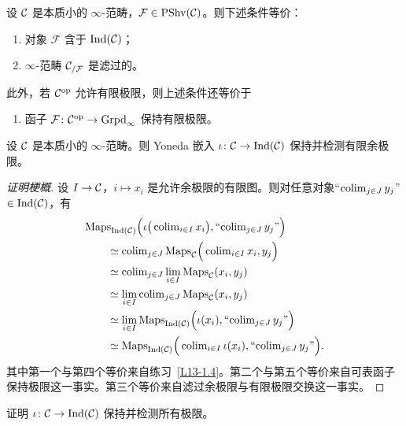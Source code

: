 \begin{proposition}[HTT.5.3.5.4]\label{L13-1.6}
设 $\mathcal{C}$ 是本质小的 $\infty$-范畴，$\mathcal{F}\in\mathrm{PShv}(\mathcal{C})$。则下述条件等价：
\begin{enumerate}[label=(\roman*),leftmargin=2.4em,itemsep=0.1em]
\item 对象 $\mathcal{F}$ 含于 $\operatorname{Ind}(\mathcal{C})$；
\item $\infty$-范畴 $\mathcal{C}_{/\mathcal{F}}$ 是滤过的。
\end{enumerate}
此外，若 $\mathcal{C}^{\mathrm{op}}$ 允许有限极限，则上述条件还等价于
\begin{enumerate}[label=(\roman*),leftmargin=2.4em,itemsep=0.1em,start=3]
\item 函子 $\mathcal{F}\colon\mathcal{C}^{\mathrm{op}}\to\operatorname{Grpd}_\infty$ 保持有限极限。
\end{enumerate}
\end{proposition}

\begin{proposition}\label{L13-1.7}
设 $\mathcal{C}$ 是本质小的 $\infty$-范畴。则 Yoneda 嵌入 $\iota\colon\mathcal{C}\to\operatorname{Ind}(\mathcal{C})$ 保持并检测有限余极限。
\end{proposition}

\begin{proof}[证明梗概]
设 $I\to\mathcal{C}$，$i\mapsto x_i$ 是允许余极限的有限图。则对任意对象“$\operatorname{colim}_{j\in J}y_j$”$\in\operatorname{Ind}(\mathcal{C})$，有
\[
\begin{aligned}
&\mathrm{Maps}_{\operatorname{Ind}(\mathcal{C})}\Big(\iota\big(\operatorname{colim}_{i\in I}x_i\big),\text{“$\operatorname{colim}_{j\in J}y_j$”}\Big)\\
&\qquad\simeq\operatorname{colim}_{j\in J}\mathrm{Maps}_{\mathcal{C}}\Big(\operatorname{colim}_{i\in I}x_i,y_j\Big)\\
&\qquad\simeq\operatorname{colim}_{j\in J}\lim_{i\in I}\mathrm{Maps}_{\mathcal{C}}(x_i,y_j)\\
&\qquad\simeq\lim_{i\in I}\operatorname{colim}_{j\in J}\mathrm{Maps}_{\mathcal{C}}(x_i,y_j)\\
&\qquad\simeq\lim_{i\in I}\mathrm{Maps}_{\operatorname{Ind}(\mathcal{C})}\Big(\iota(x_i),\text{“$\operatorname{colim}_{j\in J}y_j$”}\Big)\\
&\qquad\simeq\mathrm{Maps}_{\operatorname{Ind}(\mathcal{C})}\Big(\operatorname{colim}_{i\in I}\iota(x_i),\text{“$\operatorname{colim}_{j\in J}y_j$”}\Big).
\end{aligned}
\]
其中第一个与第四个等价来自练习~\ref{L13-1.4}。第二个与第五个等价来自可表函子保持极限这一事实。第三个等价来自滤过余极限与有限极限交换这一事实。
\end{proof}

\begin{exercise}\label{L13-1.8}
证明 $\iota\colon\mathcal{C}\to\operatorname{Ind}(\mathcal{C})$ 保持并检测所有极限。
\end{exercise}

